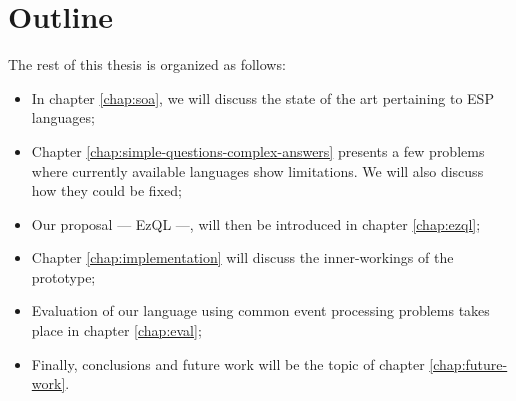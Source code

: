 \section{Outline}

The rest of this thesis is organized as follows:

\begin{itemize}
\item In chapter \ref{chap:soa}, we will discuss the state of the art
  pertaining to ESP languages;
\item Chapter \ref{chap:simple-questions-complex-answers} presents a
  few problems where currently available languages show
  limitations. We will also discuss how they could be fixed;
\item Our proposal --- EzQL ---, will then be introduced in chapter
  \ref{chap:ezql};
\item Chapter \ref{chap:implementation} will discuss the inner-workings
  of the prototype;
\item Evaluation of our language using common event processing
  problems takes place in chapter \ref{chap:eval};
\item Finally, conclusions and future work will be the topic of
  chapter \ref{chap:future-work}.
\end{itemize}
